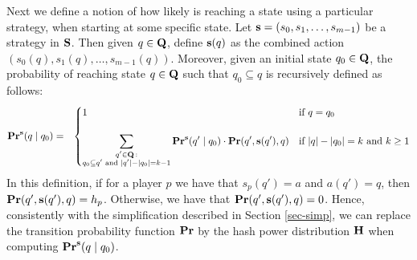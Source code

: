 Next we define a notion of how likely is reaching a state using a particular strategy, when starting at some specific state. 
Let $\mathbf{s} = (s_0, s_1, \ldots, s_{m-1})$ be a strategy in $\mathbf{S}$. Then given $q \in \mathbf{Q}$, define $\mathbf{s}(q)$ as the combined action $(s_0(q), s_1(q), \ldots, s_{m-1}(q))$. Moreover, given an initial state $q_0 \in \mathbf{Q}$, 
the probability of reaching state $q \in \mathbf{Q}$ such that $q_0 \subseteq q$ is recursively defined as follows:
\begin{eqnarray*}
\mathbf{Pr}^{\mathbf{s}}(q \mid q_0) & = &
\begin{cases}
1 & \text{if } q =  q_0\\
& \\
{\displaystyle \sum_{\substack{q' \in \mathbf{Q} \,:\\ q_0 \subseteq q' \text{ and } |q'| - |q_0| = k-1}} \mathbf{Pr}^{\mathbf{s}}(q' \mid q_0) \cdot \mathbf{Pr}(q', \mathbf{s}(q'), q)}
 & \text{if } |q| - |q_0| = k \text{ and } k \geq 1
\end{cases}
\end{eqnarray*}
In this definition, if for a player $p$ we have that $s_p(q') = a$ and $a(q') = q$, then $\mathbf{Pr}(q', \mathbf{s}(q'), q) = h_p$. Otherwise, we have that $\mathbf{Pr}(q', \mathbf{s}(q'), q) = 0$. Hence, consistently with the simplification described in Section \ref{sec-simp}, we can replace the transition probability function $\mathbf{Pr}$ by the hash power distribution $\mathbf{H}$ when computing $\mathbf{Pr}^{\mathbf{s}}(q \mid q_0)$. 

